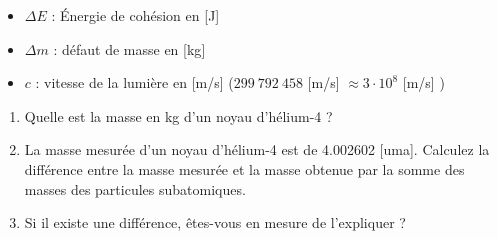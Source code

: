\documentclass[
  11pt,
  a4paper,
  openany]{book}
\providecommand{\tightlist}{%
  \setlength{\itemsep}{0pt}\setlength{\parskip}{0pt}}
\begin{document}
\begin{itemize}
\tightlist
\item
  \(\Delta E\) : Énergie de cohésion en {[}J{]}\\
\item
  \(\Delta m\) : défaut de masse en {[}kg{]}\\
\item
  \(c\) : vitesse de la lumière en {[}m/s{]} (\(299\ 792\ 458\) {[}m/s{]} \(\approx 3 \cdot 10^8\) {[}m/s{]} )
\end{itemize}

\begin{Exercise}

\begin{enumerate}
\def\labelenumi{\arabic{enumi}.}
\tightlist
\item
  Quelle est la masse en kg d'un noyau d'hélium-4 ?\\
\item
  La masse mesurée d'un noyau d'hélium-4 est de 4.002602 {[}uma{]}. Calculez la différence entre la masse mesurée et la masse obtenue par la somme des masses des particules subatomiques.
\item
  Si il existe une différence, êtes-vous en mesure de l'expliquer ?
\end{enumerate}

\end{Exercise}
\end{document}
